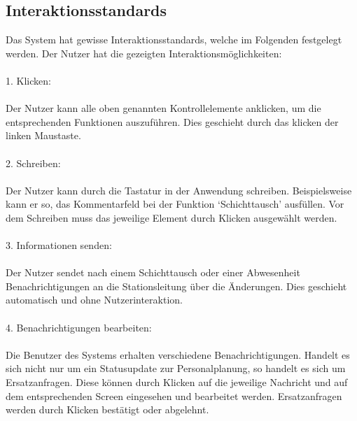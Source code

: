 \documentclass[11pt,
paper=a4,
bibtotocnumbered,	  %
liststotocnumbered,  %
DIV=calc,		  %
tablecaptionabove,	  %
headinclude,
]{article}
\begin{document}
\subsection{Interaktionsstandards}
Das System hat gewisse Interaktionsstandards, welche im Folgenden festgelegt werden. Der Nutzer hat die gezeigten Interaktionsmöglichkeiten: \\\\

1. Klicken: \\\\
Der Nutzer kann alle oben genannten Kontrollelemente anklicken, um die entsprechenden Funktionen auszuführen. Dies geschieht durch das klicken der linken Maustaste. \\\\
2. Schreiben:\\\\
Der Nutzer kann durch die Tastatur in der Anwendung schreiben. Beispielsweise kann er so, das Kommentarfeld bei der Funktion ‘Schichttausch’ ausfüllen. Vor dem Schreiben muss das jeweilige Element durch Klicken ausgewählt werden. \\\\
3. Informationen senden:\\\\
Der Nutzer sendet nach einem Schichttausch oder einer Abwesenheit Benachrichtigungen an die Stationsleitung über die Änderungen. Dies geschieht automatisch und ohne Nutzerinteraktion.\\\\
4. Benachrichtigungen bearbeiten:\\\\
Die Benutzer des Systems erhalten verschiedene Benachrichtigungen. Handelt es sich nicht nur um ein Statusupdate zur Personalplanung, so handelt es sich um Ersatzanfragen. Diese können durch Klicken auf die jeweilige Nachricht und auf dem entsprechenden Screen eingesehen und bearbeitet werden. Ersatzanfragen werden durch Klicken bestätigt oder abgelehnt.
\end{document}
